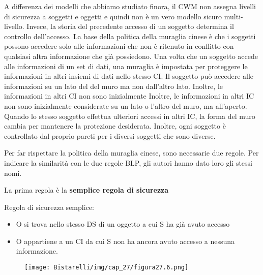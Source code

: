 A differenza dei modelli che abbiamo studiato finora, il CWM non assegna livelli di sicurezza a soggetti e oggetti e quindi non è un vero modello sicuro multi-livello. Invece, la storia del precedente accesso di un soggetto determina il controllo dell'accesso. La base della politica della muraglia cinese è che i soggetti possono accedere solo alle informazioni che non è ritenuto in conflitto con qualsiasi altra informazione che già possiedono. Una volta che un soggetto accede alle informazioni di un set di dati, una muraglia è impostata per proteggere le informazioni in altri insiemi di dati nello stesso CI. Il soggetto può accedere alle informazioni su un lato del del muro ma non dall'altro lato. Inoltre, le informazioni in altri CI non sono inizialmente Inoltre, le informazioni in altri IC non sono inizialmente considerate su un lato o l'altro del muro, ma all'aperto. Quando lo stesso soggetto effettua ulteriori accessi in altri IC, la forma del muro cambia per mantenere la protezione desiderata. Inoltre, ogni soggetto è controllato dal proprio pareti per i diversi soggetti che sono diverse.

\singlespacing

Per far rispettare la politica della muraglia cinese, sono necessarie due regole. Per indicare la similarità con le due regole BLP, gli autori hanno dato loro gli stessi nomi.

\singlespacing

\begin{center}
    La prima regola è la \textbf{semplice regola di sicurezza}
\end{center}

Regola di sicurezza semplice:
\begin{itemize}
    \item O si trova nello stesso DS di un oggetto a cui S ha già avuto accesso
    \item O appartiene a un CI da cui S non ha ancora avuto accesso a nessuna informazione.
\end{itemize}

\begin{figure}[H]
	\centering
    \texttt{[image: Bistarelli/img/cap\_27/figura27.6.png]}
\end{figure}

